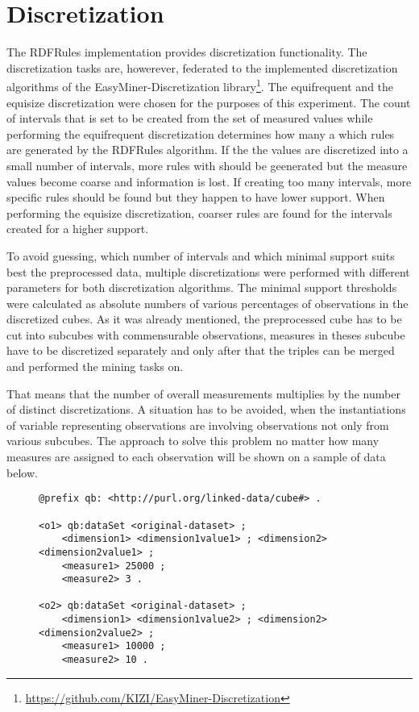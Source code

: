 \section{Discretization\label{discretization}}

The RDFRules implementation provides discretization functionality. The discretization tasks are, howerever, federated to the implemented discretization algorithms of the EasyMiner-Discretization library\footnote{\href{https://github.com/KIZI/EasyMiner-Discretization}{https://github.com/KIZI/EasyMiner-Discretization}}. The equifrequent and the equisize discretization were chosen for the purposes of this experiment. The count of intervals that is set to be created from the set of measured values while performing the equifrequent discretization determines how many a which rules are generated by the RDFRules algorithm. If the the values are discretized into a small number of intervals, more rules with should be geenerated but the measure values become coarse and information is lost. If creating too many intervals, more specific rules should be found but they happen to have lower support. When performing the equisize discretization, coarser rules are found for the intervals created for a higher support. 

To avoid guessing, which number of intervals and which minimal support suits best the preprocessed data, multiple discretizations were performed with different parameters for both discretization algorithms. The minimal support thresholds were calculated as absolute numbers of various percentages of observations in the discretized cubes. As it was already mentioned, the preprocessed cube has to be cut into subcubes with commensurable observations, measures in theses subcube have to be discretized separately and only after that the triples can be merged and performed the mining tasks on.

That means that the number of overall measurements multiplies by the number of distinct discretizations. A situation has to be avoided, when the instantiations of variable representing observations are involving observations not only from various subcubes. The approach to solve this problem no matter how many measures are assigned to each observation will be shown on a sample of data below.

\begin{figure}[h]
\begin{lstlisting}[language = turtle, caption={Observation example}, label={discsample},captionpos=b escapeinside={(*@}{@*)}]
@prefix qb: <http://purl.org/linked-data/cube#> .

<o1> qb:dataSet <original-dataset> ;
    <dimension1> <dimension1value1> ; <dimension2> <dimension2value1> ;
    <measure1> 25000 ;
    <measure2> 3 .

<o2> qb:dataSet <original-dataset> ;
    <dimension1> <dimension1value2> ; <dimension2> <dimension2value2> ;
    <measure1> 10000 ;
    <measure2> 10 .
 \end{lstlisting}
\end{figure}

